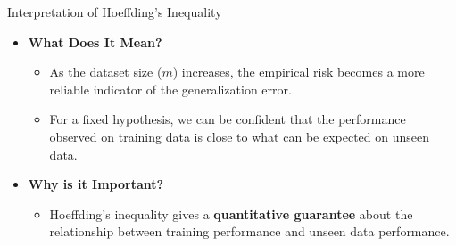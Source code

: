 \documentclass[
  ignorenonframetext,
]{beamer}
\providecommand{\tightlist}{%
  \setlength{\itemsep}{0pt}\setlength{\parskip}{0pt}}\usepackage{longtable,booktabs,array}
\begin{document}
\begin{frame}{Interpretation of Hoeffding's Inequality}
\label{interpretation-of-hoeffdings-inequality}
\begin{itemize}
\tightlist
\item
  \textbf{What Does It Mean?}

  \begin{itemize}
  \tightlist
  \item
    As the dataset size (\(m\)) increases, the empirical risk becomes a
    more reliable indicator of the generalization error.
  \item
    For a fixed hypothesis, we can be confident that the performance
    observed on training data is close to what can be expected on unseen
    data.
  \end{itemize}
\item
  \textbf{Why is it Important?}

  \begin{itemize}
  \tightlist
  \item
    Hoeffding's inequality gives a \textbf{quantitative guarantee} about
    the relationship between training performance and unseen data
    performance.
  \end{itemize}
\end{itemize}
\end{frame}
\end{document}
